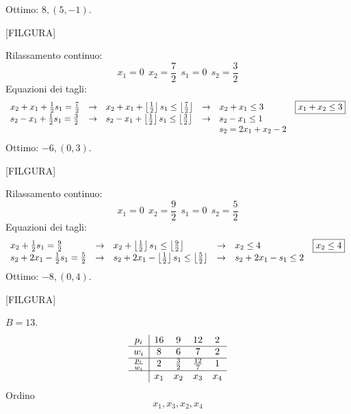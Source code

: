 Ottimo: $8,( 5,-1)$.

[FILGURA]

\Es

Rilassamento continuo:
\begin{equation*}
x_{1} =0\ \ x_{2} =\frac{7}{2} \ \ s_{1} =0\ \ s_{2} =\frac{3}{2}
\end{equation*}
Equazioni dei tagli:
\begin{equation*}
\begin{array}{ l l l l l c }
x_{2} +x_{1} +\frac{1}{2} s_{1} =\frac{7}{2} & \rightarrow  & x_{2} +x_{1} +\left\lfloor \frac{1}{2}\right\rfloor s_{1} \leq \left\lfloor \frac{7}{2}\right\rfloor  & \rightarrow  & x_{2} +x_{1} \leq 3 & \boxed{x_{1} +x_{2} \leq 3}\\
s_{2} -x_{1} +\frac{1}{2} s_{1} =\frac{3}{2} & \rightarrow  & s_{2} -x_{1} +\left\lfloor \frac{1}{2}\right\rfloor s_{1} \leq \left\lfloor \frac{3}{2}\right\rfloor  & \rightarrow  & s_{2} -x_{1} \leq 1 & \\
 &  &  &  & s_{2} =2x_{1} +x_{2} -2 & 
\end{array}
\end{equation*}
Ottimo: $-6,( 0,3)$.

[FILGURA]

\Es

Rilassamento continuo:
\begin{equation*}
x_{1} =0\ \ x_{2} =\frac{9}{2} \ \ s_{1} =0\ \ s_{2} =\frac{5}{2}
\end{equation*}
Equazioni dei tagli:
\begin{equation*}
\begin{array}{ l l l l l c }
x_{2} +\frac{1}{2} s_{1} =\frac{9}{2} & \rightarrow  & x_{2} +\left\lfloor \frac{1}{2}\right\rfloor s_{1} \leq \left\lfloor \frac{9}{2}\right\rfloor  & \rightarrow  & x_{2} \leq 4 & \boxed{x_{2} \leq 4}\\
s_{2} +2x_{1} -\frac{1}{2} s_{1} =\frac{5}{2} & \rightarrow  & s_{2} +2x_{1} -\left\lfloor \frac{1}{2}\right\rfloor s_{1} \leq \left\lfloor \frac{5}{2}\right\rfloor  & \rightarrow  & s_{2} +2x_{1} -s_{1} \leq 2 & 
\end{array}
\end{equation*}
Ottimo: $-8,( 0,4)$.

[FILGURA]

\Es

$B=13$.
\begin{equation*}
\begin{array}{ c|c c c c }
p_{i} & 16 & 9 & 12 & 2\\
\hline
w_{i} & 8 & 6 & 7 & 2\\
\hline
\frac{p_{i}}{w_{i}} & 2 & \frac{3}{2} & \frac{12}{7} & 1\\
\hline
 & x_{1} & x_{2} & x_{3} & x_{4}
\end{array}
\end{equation*}
Ordino
\begin{equation*}
x_{1} ,x_{3} ,x_{2} ,x_{4}
\end{equation*}


